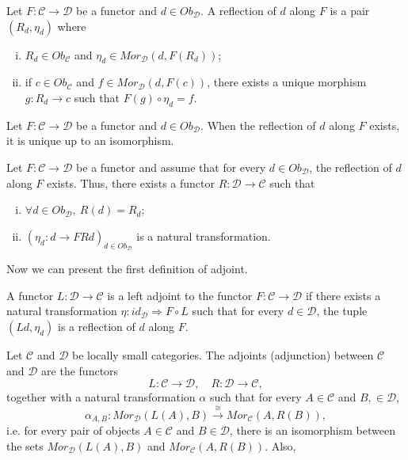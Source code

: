 \begin{definition}[Reflection]
  Let $F:\mathcal C \to \mathcal D$ be a functor and $d \in Ob_\mathcal D$.
  A reflection of $d$ along $F$ is a pair $(R_d, \eta_d)$ where
  \begin{enumerate}[(i)]
    \item $R_d \in Ob_\mathcal C$ and $\eta_d \in Mor_{\mathcal D}(d, F(R_d))$;
    \item if $c \in Ob_\mathcal C$ and $f \in Mor_{\mathcal D}(d,F(c))$, there exists
      a unique morphism $g:R_d \to c$ such that
      $F(g) \circ \eta_d = f$.
  \end{enumerate}
\end{definition}

\begin{proposition}
  Let $F:\mathcal C \to \mathcal D$ be a functor and $d \in Ob_\mathcal D$.
  When the reflection of $d$ along $F$ exists, it is unique up to an isomorphism.
\end{proposition}

\begin{proposition}
  Let $F:\mathcal C \to \mathcal D$ be a functor and assume that for every
  $d \in Ob_\mathcal D$, the reflection of $d$ along $F$ exists. Thus, there
  exists a functor $R:\mathcal D \to \mathcal C$ such that
  \begin{enumerate}[(i)]
    \item $\forall d \in Ob_\mathcal D, \ R(d) = R_d$;
    \item $(\eta_d:d \to FRd)_{d \in Ob_\mathcal D}$ is a natural transformation.
  \end{enumerate}
\end{proposition}

Now we can present the first definition of adjoint.
\begin{definition}[Adjoint]
  A functor $L:\mathcal D \to \mathcal C$ is a left adjoint to the functor
  $F:\mathcal C \to \mathcal D$ if there exists a natural transformation
  $\eta:id_{\mathcal D} \Rightarrow F \circ L$ such that for every
  $d \in \mathcal D$, the tuple $(Ld, \eta_d)$ is a reflection of $d$
  along $F$.
\end{definition}

\begin{definition}[Ajdoint]
  Let $\mathcal C$ and $\mathcal D$ be locally small categories. The adjoints (adjunction) between
  $\mathcal C$ and $\mathcal D$ are the functors
  \begin{displaymath}
    L:\mathcal C \to \mathcal D, \quad R:\mathcal D \to \mathcal C,
  \end{displaymath}
  together with a natural transformation $\alpha$ such that for every
  $A \in \mathcal C$ and $B, \in \mathcal D$,
  \begin{displaymath}
    \alpha_{A,B}: Mor_\mathcal D (L(A), B) \overset{\cong}{\longrightarrow} Mor_\mathcal C (A, R(B)),
  \end{displaymath}
  i.e. for every pair of objects $A \in \mathcal C$  and $B \in \mathcal D$, there is an isomorphism
  between the sets $Mor_\mathcal D(L(A), B)$ and $Mor_\mathcal C (A, R(B))$.
  Also, 
\end{definition}

